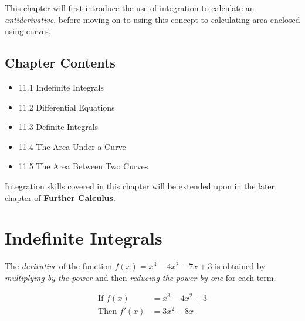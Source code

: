 \documentclass[
  11pt,
  openany]{book}
\begin{document}
\begin{center}
\end{center}

This chapter will first introduce the use of integration to calculate an \emph{antiderivative}, before moving on to using this concept to calculating area enclosed using curves.

\subsection*{Chapter Contents}\label{chapter-contents}

\begin{itemize}
    \setlength\itemsep{2em}
    \item[\textcolor{RoyalBlue}{\textbullet}] 11.1 Indefinite Integrals
    \item[\textcolor{RoyalBlue}{\textbullet}] 11.2 Differential Equations
    \item[\textcolor{RoyalBlue}{\textbullet}] 11.3 Definite Integrals
    \item[\textcolor{RoyalBlue}{\textbullet}] 11.4 The Area Under a Curve
    \item[\textcolor{RoyalBlue}{\textbullet}] 11.5 The Area Between Two Curves
\end{itemize}

Integration skills covered in this chapter will be extended upon in the later chapter of \textbf{Further Calculus}.

\newpage

\section{Indefinite Integrals}\label{indefinite-integrals}

The \textit{derivative} of the function \(f(x)=x^3-4x^2-7x+3\) is obtained by \textit{multiplying by the power} and then \textit{reducing the power by one} for each term.

\vspace{-0.5cm}

\begin{align*}
    \text{If }f(x)&=x^3-4x^2+3\\
    \text{Then }f'(x)&=3x^2-8x
\end{align*}
\end{document}
